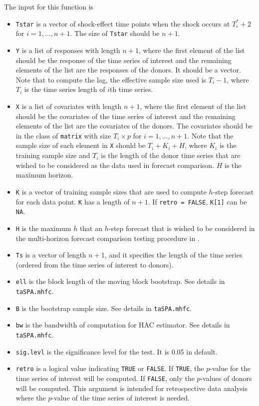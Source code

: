 \documentclass[12pt]{article}
\begin{document}
 The input for this function is
\begin{itemize}
	\item \texttt{Tstar} is a vector of shock-effect time points when the shock occurs at $T^*_i+2$ for $i = 1, \ldots, n+1$. The size of \texttt{Tstar} should be $n+1$. 
	\item \texttt{Y} is a list of responses with length $n +1$,  where the first element of the list should be the response of the time series of interest and the remaining elements of the list are the responses of the donors. It should be a vector.  Note  that to compute the lag, the effective sample size used is $T_i - 1$, where $T_i$ is the time series length of $i$th time series.
	\item \texttt{X} is a list of covariates with length $n+1$, where the first element of the list should be the covariates of the time series of interest and the remaining elements of the list are the covariates of the donors. The covariates should be in the class of \texttt{matrix} with size $T_i\times p$ for $i = 1, \ldots, n+1$. Note that the sample size of each element  in \texttt{X} should be  $T_i+ K_i + H$, where $K_i$ is the training sample size and $T_i$ is the length of the donor time series that are wished to be considered as the data used in forecast comparison. $H$ is the maximum horizon.
	\item \texttt{K} is a vector of training sample sizes that are used to compute $h$-step forecast for each data point. \texttt{K} has a length of $n+1$. If \texttt{retro = FALSE}, \texttt{K[1]} can be \texttt{NA}.
	\item \texttt{H} is the maximum $h$ that an $h$-step forecast that is wished to be considered in the multi-horizon forecast comparison testing procedure in .
	\item \texttt{Ts} is a vector of length $n+1$, and it specifies the length of the time series (ordered from the time series of interest to donors).
	\item \texttt{ell} is the block length of the moving block bootstrap. See details in \texttt{taSPA.mhfc}.
	\item \texttt{B} is the bootstrap sample size. See details in \texttt{taSPA.mhfc}.
	\item \texttt{bw} is the bandwidth of computation for HAC estimator. See details in \texttt{taSPA.mhfc}.
	\item \texttt{sig.levl} is the significance level for the test. It is 0.05 in default.
	\item \texttt{retro} is a logical value indicating \texttt{TRUE} or \texttt{FALSE}. If  \texttt{TRUE}, the $p$-value for the time series of interest will be computed. If  \texttt{FALSE}, only the $p$-values of donors will be computed. This argument is intended for retrospective data analysis where the $p$-value of the time series of interest is needed.
\end{itemize}
 
\end{document}
